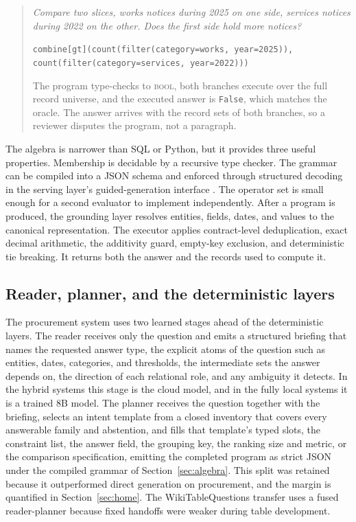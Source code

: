 \documentclass{article}
\begin{document}
\begin{quote}\small
\textit{Compare two slices, works notices during 2025 on one side, services
notices during 2022 on the other. Does the first side hold more notices?}

\smallskip
\texttt{combine[gt](count(filter(category=works, year=2025)),}\\
\texttt{\phantom{combine[gt](}count(filter(category=services, year=2022)))}

\smallskip
The program type-checks to \textsc{bool}, both branches execute over the
full record universe, and the executed answer is \texttt{False}, which
matches the oracle. The answer arrives with the record sets of both
branches, so a reviewer disputes the program, not a paragraph.
\end{quote}

The algebra is narrower than SQL or Python, but it provides three useful
properties. Membership is decidable by a recursive type checker. The grammar
can be compiled into a JSON schema and enforced through structured
decoding in the serving layer's guided-generation interface
\citep{dong2024xgrammar}. The operator set is small enough for a second evaluator
to implement independently. After a program is produced, the grounding layer
resolves entities, fields, dates, and values to the canonical representation.
The executor applies contract-level deduplication, exact decimal arithmetic,
the additivity guard, empty-key exclusion, and deterministic tie breaking. It
returns both the answer and the records used to compute it.

\subsection{Reader, planner, and the deterministic layers}
\label{sec:planning}

The procurement system uses two learned stages ahead of the deterministic
layers. The reader receives only the question and emits a structured
briefing that names the requested answer type, the explicit atoms of the
question such as entities, dates, categories, and thresholds, the
intermediate sets the answer depends on, the direction of each relational
role, and any ambiguity it detects. In the hybrid systems this stage is
the cloud model, and in the fully local systems it is a trained 8B model.
The planner receives the question together with the briefing, selects an
intent template from a closed inventory that covers every answerable
family and abstention, and fills that template's typed slots, the
constraint list, the answer field, the grouping key, the ranking size and
metric, or the comparison specification, emitting the completed program as
strict JSON under the compiled grammar of Section~\ref{sec:algebra}. This
split was retained because it outperformed direct generation on
procurement, and the margin is quantified in Section~\ref{sec:home}. The
WikiTableQuestions transfer uses a fused reader-planner because fixed
handoffs were weaker during table development.
\end{document}

